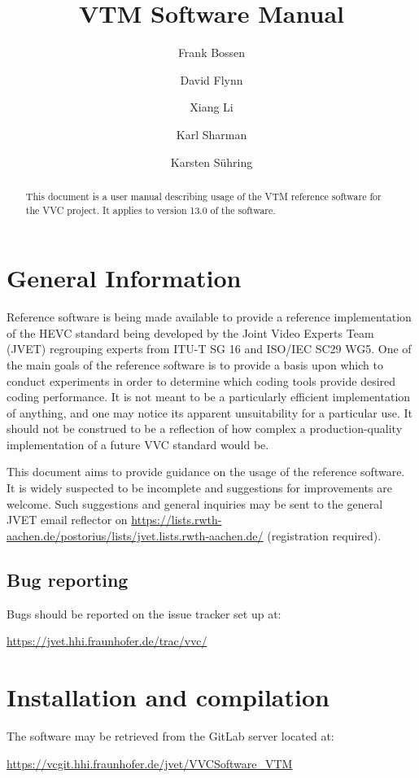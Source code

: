 ﻿\documentclass[a4paper,11pt]{jvetdoc}
\title{VTM Software Manual}
\author{%
	Frank Bossen
	\email{frank@bossentech.com}
	\and
	David Flynn
	\and
	Xiang Li
	\email{xlxiangli@tencent.com}
	\and
	Karl Sharman
	\email{karl.sharman@eu.sony.com}
	\and
	Karsten S\"uhring
	\email{karsten.suehring@hhi.fraunhofer.de}
}
\begin{document}
\maketitle
\begin{abstract}
This document is a user manual describing usage of the VTM reference software
for the VVC project. It applies to version 13.0 of the software.
\end{abstract}

\tableofcontents
\listoftables


\section{General Information}
Reference software is being made available to provide a reference
implementation of the HEVC standard being developed by the Joint 
Video Experts Team (JVET) regrouping experts from
ITU-T SG 16 and ISO/IEC SC29 WG5. One of the main goals of the
reference software is to provide a basis upon which to conduct
experiments in order to determine which coding tools provide desired
coding performance. It is not meant to be a particularly efficient
implementation of anything, and one may notice its apparent
unsuitability for a particular use. It should not be construed to be a
reflection of how complex a production-quality implementation of a
future VVC standard would be.

This document aims to provide guidance on the usage of the reference
software. It is widely suspected to be incomplete and suggestions for
improvements are welcome. Such suggestions and general inquiries may be
sent to the general JVET email reflector on
\url{https://lists.rwth-aachen.de/postorius/lists/jvet.lists.rwth-aachen.de/} 
(registration required).

\subsection*{Bug reporting}
Bugs should be reported on the issue tracker set up at:

\url{https://jvet.hhi.fraunhofer.de/trac/vvc/}

\section{Installation and compilation}
The software may be retrieved from the GitLab server located at:

\url{https://vcgit.hhi.fraunhofer.de/jvet/VVCSoftware_VTM}
\end{document}

